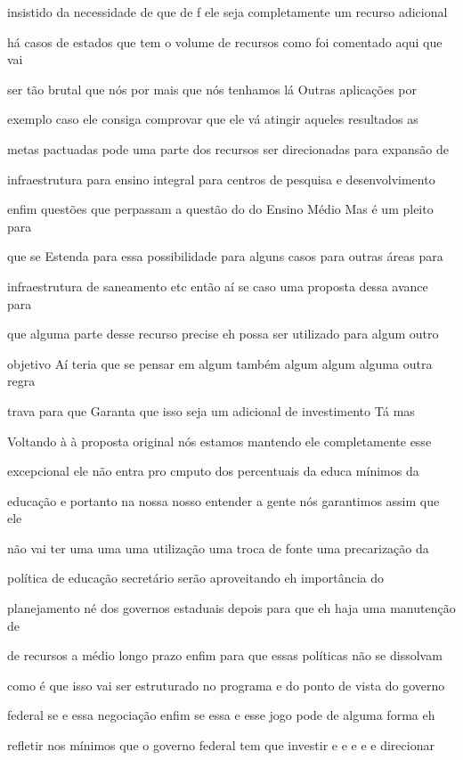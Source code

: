 \documentclass[a4paper,12pt]{article}
\begin{document}
insistido da necessidade de que de f ele seja completamente um recurso adicional

há casos de estados que tem o volume de recursos como foi comentado aqui que vai

ser tão brutal que nós por mais que nós tenhamos lá Outras aplicações por

exemplo caso ele consiga comprovar que ele vá atingir aqueles resultados as

metas pactuadas pode uma parte dos recursos ser direcionadas para expansão de

infraestrutura para ensino integral para centros de pesquisa e desenvolvimento

enfim questões que perpassam a questão do do Ensino Médio Mas é um pleito para

que se Estenda para essa possibilidade para alguns casos para outras áreas para

infraestrutura de saneamento etc então aí se caso uma proposta dessa avance para

que alguma parte desse recurso precise eh possa ser utilizado para algum outro

objetivo Aí teria que se pensar em algum também algum algum alguma outra regra

trava para que Garanta que isso seja um adicional de investimento Tá mas

Voltando à à proposta original nós estamos mantendo ele completamente esse

excepcional ele não entra pro cmputo dos percentuais da educa mínimos da

educação e portanto na nossa nosso entender a gente nós garantimos assim que ele

não vai ter uma uma uma utilização uma troca de fonte uma precarização da

política de educação secretário serão aproveitando eh importância do

planejamento né dos governos estaduais depois para que eh haja uma manutenção de

de recursos a médio longo prazo enfim para que essas políticas não se dissolvam

como é que isso vai ser estruturado no programa e do ponto de vista do governo

federal se e essa negociação enfim se essa e esse jogo pode de alguma forma eh

refletir nos mínimos que o governo federal tem que investir e e e e e direcionar
\end{document}

